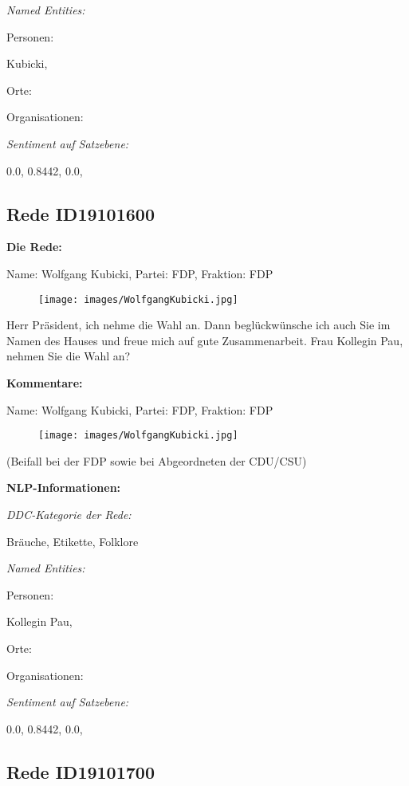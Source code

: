 \documentclass[10pt, a4paper]{report}
\begin{document}
\textit{Named Entities:}

Personen:

Kubicki, 

Orte:



Organisationen:



\textit{Sentiment auf Satzebene:}

0.0, 0.8442, 0.0, 
\subsection{Rede ID19101600}

\textbf{Die Rede:}

Name: Wolfgang Kubicki, Partei: FDP, Fraktion: FDP

\begin{figure}[!ht]
\texttt{[image: images/WolfgangKubicki.jpg]}
\end{figure}


Herr Präsident, ich nehme die Wahl an. Dann beglückwünsche ich auch Sie im Namen des Hauses und freue mich auf gute Zusammenarbeit. Frau Kollegin Pau, nehmen Sie die Wahl an? 

\textbf{Kommentare:}

Name: Wolfgang Kubicki, Partei: FDP, Fraktion: FDP

\begin{figure}[!ht]
\texttt{[image: images/WolfgangKubicki.jpg]}
\end{figure}


(Beifall bei der FDP sowie bei Abgeordneten der CDU/CSU)


\textbf{NLP-Informationen:}

\textit{DDC-Kategorie der Rede:}

Bräuche, Etikette, Folklore

\textit{Named Entities:}

Personen:

Kollegin Pau, 

Orte:



Organisationen:



\textit{Sentiment auf Satzebene:}

0.0, 0.8442, 0.0, 
\subsection{Rede ID19101700}
\end{document}
